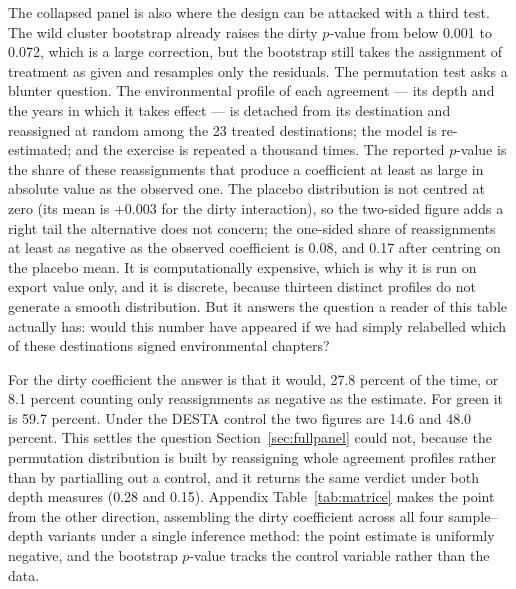 \documentclass[12pt]{article}
\begin{document}
The collapsed panel is also where the design can be attacked with a third test. The wild cluster
bootstrap already raises the dirty $p$-value from below 0.001 to 0.072, which is a large correction,
but the bootstrap still takes the assignment of treatment as given and resamples only the residuals.
The permutation test asks a blunter question. The environmental profile of each agreement --- its
depth and the years in which it takes effect --- is detached from its destination and reassigned at
random among the 23 treated destinations; the model is re-estimated; and the exercise is repeated a
thousand times. The reported $p$-value is the share of these reassignments that produce a coefficient
at least as large in absolute value as the observed one.
The placebo distribution is not centred at zero (its mean is $+0.003$ for the dirty interaction),
so the two-sided figure adds a right tail the alternative does not concern; the one-sided share of
reassignments at least as negative as the observed coefficient is 0.08, and 0.17 after centring on
the placebo mean.
It is computationally expensive, which is
why it is run on export value only, and it is discrete, because thirteen distinct profiles do not
generate a smooth distribution. But it answers the question a reader of this table actually has:
would this number have appeared if we had simply relabelled which of these destinations signed
environmental chapters?

For the dirty coefficient the answer is that it would, 27.8 percent of the time, or 8.1 percent counting only reassignments as negative as the estimate. For green it is 59.7
percent. Under the DESTA control the two figures are 14.6 and 48.0 percent. This settles the question
Section~\ref{sec:fullpanel} could not, because the permutation distribution is built by reassigning whole
agreement profiles rather than by partialling out a control, and it returns the same verdict under
both depth measures (0.28 and 0.15). Appendix Table~\ref{tab:matrice} makes the point from the other direction, assembling
the dirty coefficient across all four sample--depth variants under a single inference method: the
point estimate is uniformly negative, and the bootstrap $p$-value tracks the control variable rather
than the data.
\end{document}

